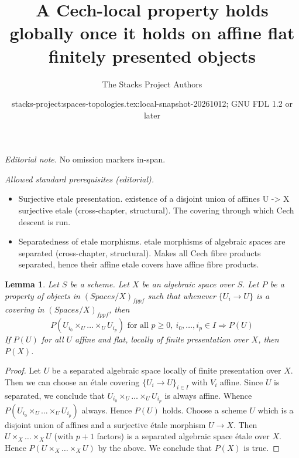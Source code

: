 \documentclass{stacks-project}
\title{A Cech-local property holds globally once it holds on affine flat finitely presented objects}
\author{The Stacks Project Authors}
\date{stacks-project:spaces-topologies.tex:local-snapshot-20261012; GNU FDL 1.2 or later}
\theoremstyle{plain}
\newtheorem{lemma}[subsection]{Lemma}
\theoremstyle{definition}
\theoremstyle{remark}
\numberwithin{equation}{subsection}
\begin{document}
\maketitle
\noindent\textit{Editorial note.} No omission markers in-span.\par\medskip
\noindent\textit{Allowed standard prerequisites (editorial).}\begin{itemize}
\item Surjective etale presentation. existence of a disjoint union of affines U -> X surjective etale (cross-chapter, structural). The covering through which Cech descent is run.
\item Separatedness of etale morphisms. etale morphisms of algebraic spaces are separated (cross-chapter, structural). Makes all Cech fibre products separated, hence their affine etale covers have affine fibre products.
\end{itemize}\medskip
\begin{lemma}
\label{lemma-cech-enough}
Let $S$ be a scheme. Let $X$ be an algebraic space over $S$.
Let $P$ be a property of objects in $(\textit{Spaces}/X)_{fppf}$
such that whenever $\{U_i \to U\}$ is a covering in
$(\textit{Spaces}/X)_{fppf}$, then
$$
P(U_{i_0} \times_U \ldots \times_U U_{i_p})
\text{ for all }
p \geq 0,\ i_0, \ldots, i_p \in I
\Rightarrow P(U)
$$
If $P(U)$ for all $U$ affine and flat, locally of finite presentation over $X$,
then $P(X)$.
\end{lemma}

\begin{proof}
Let $U$ be a separated algebraic space locally of finite presentation over $X$.
Then we can choose an \'etale covering $\{U_i \to U\}_{i \in I}$ with $V_i$
affine. Since $U$ is separated, we conclude that
$U_{i_0} \times_U \ldots \times_U U_{i_p}$ is always affine.
Whence $P(U_{i_0} \times_U \ldots \times_U U_{i_p})$ always.
Hence $P(U)$ holds. Choose a scheme $U$ which is a disjoint union of
affines and a surjective \'etale morphism $U \to X$.
Then $U \times_X \ldots \times_X U$ (with $p + 1$ factors)
is a separated algebraic space
\'etale over $X$. Hence $P(U \times_X \ldots \times_X U)$ by the above.
We conclude that $P(X)$ is true.
\end{proof}
\end{document}
